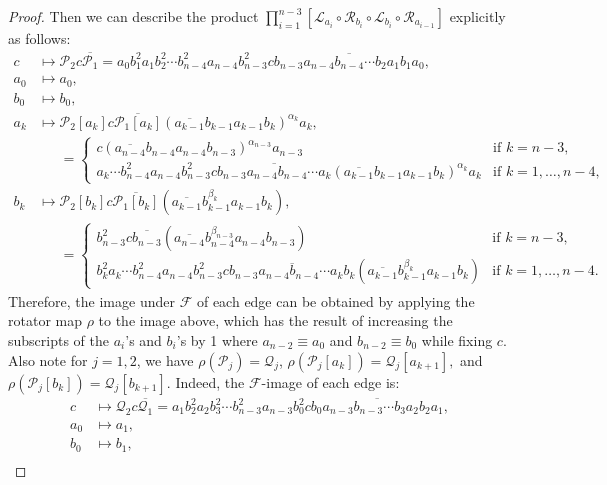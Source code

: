 \documentclass[11pt, letterpaper]{amsart}
\theoremstyle{plain}
\theoremstyle{definition}
\newcommand{\cL}{\mathcal{L}}
\newcommand{\cR}{\mathcal{R}}
\newcommand{\cP}{\mathcal{P}}
\newcommand{\cQ}{\mathcal{Q}}
\newcommand{\calF}{\mathcal{F}}
\newcommand{\ov}[1]{\overline{#1}}
\begin{document}
\begin{proof}
Then we can describe the product $\prod_{i=1}^{n-3}[\cL_{a_{i}} \circ \cR_{b_i} \circ \cL_{b_i} \circ \cR_{a_{i-1}}]$ explicitly as follows:
\begin{align*}
    c &\longmapsto \cP_2 c \ov{\cP_1} = a_0b_1^2a_1b_2^2\cdots b_{n-4}^2a_{n-4}b_{n-3}^2c \ov{b_{n-3}a_{n-4}b_{n-4}\cdots b_2a_1b_1a_0},\\
    a_0 &\longmapsto a_0,\\
    b_0 &\longmapsto b_0,\\
    a_k &\longmapsto \cP_2[a_k]c\ov{\cP_1[a_k]}\left(\ov{a_{k-1}}b_{k-1}a_{k-1}b_k\right)^{\alpha_k}a_k,\\
    &\phantom{\!\mapsto}=
    \begin{cases}
        c\left(\ov{a_{n-4}}b_{n-4}a_{n-4}b_{n-3}\right)^{\alpha_{n-3}}a_{n-3} & \text{if $k=n-3$,}\\
        a_k\cdots b_{n-4}^2a_{n-4}b_{n-3}^2c\ov{b_{n-3}a_{n-4}b_{n-4}\cdots a_k}\left(\ov{a_{k-1}}b_{k-1}a_{k-1}b_k\right)^{\alpha_k}a_k & \text{if $k=1,\ldots,n-4,$}
    \end{cases}\\
    b_k &\longmapsto \cP_2[b_k]c\ov{\cP_1[b_k]}\left(\ov{a_{k-1}}b_{k-1}^{\beta_{k}}a_{k-1}b_k\right),\\
    &\phantom{\!\mapsto}=
    \begin{cases}
        b_{n-3}^2c\ov{b_{n-3}}\left(\ov{a_{n-4}}b_{n-4}^{\beta_{n-3}}a_{n-4}b_{n-3}\right) & \text{if $k=n-3$},\\
        b_k^2a_k\cdots b_{n-4}^2a_{n-4}b_{n-3}^2c\ov{b_{n-3}a_{n-4}b_{n-4}\cdots a_kb_k}\left(\ov{a_{k-1}}b_{k-1}^{\beta_{k}}a_{k-1}b_k\right) & \text{if $k=1,\ldots,n-4.$}
    \end{cases}
\end{align*}
Therefore, the image under $\calF$ of each edge can be obtained by applying the
rotator map $\rho$ to the image above, which has the result of increasing the subscripts of the $a_i$'s
and $b_i$'s by 1 where $a_{n-2}\equiv a_0$ and $b_{n-2}\equiv b_0$ while
fixing $c$. Also note for $j=1,2$, we have $\rho(\cP_j) =\cQ_j$, $\rho(\cP_j[a_k]) = \cQ_j[a_{k+1}],$ and $\rho(\cP_j[b_k]) = \cQ_j[b_{k+1}].$ Indeed, the $\calF$-image of each edge is:
\begin{align*}
    c &\longmapsto \cQ_2 c \ov{\cQ_1}= a_1b_2^2a_2b_3^2\cdots b_{n-3}^2a_{n-3}b_0^2c\ov{b_0a_{n-3}b_{n-3}\cdots b_3a_2b_2a_1},\\
    a_0 &\longmapsto a_1,\\
    b_0 &\longmapsto b_1,\\

\end{align*}
\end{proof}
\end{document}
